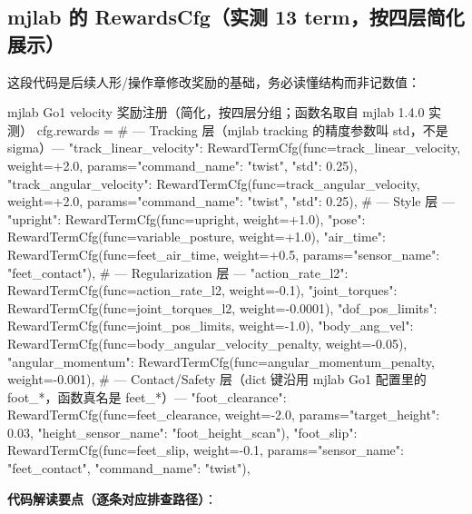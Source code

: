 \subsection{mjlab 的 RewardsCfg（实测 13 term，按四层简化展示）}
\label{sec:rlmc-ql-reward-cfg}

这段代码是后续人形/操作章修改奖励的基础，务必读懂结构而非记数值：

\begin{codebox}[Python]{mjlab Go1 velocity 奖励注册（简化，按四层分组；函数名取自 mjlab 1.4.0 实测）}
cfg.rewards = {
    # --- Tracking 层（mjlab tracking 的精度参数叫 std，不是 sigma）---
    "track_linear_velocity":  RewardTermCfg(func=track_linear_velocity,  weight=+2.0,
                                  params={"command_name": "twist", "std": 0.25}),
    "track_angular_velocity": RewardTermCfg(func=track_angular_velocity, weight=+2.0,
                                  params={"command_name": "twist", "std": 0.25}),
    # --- Style 层 ---
    "upright":          RewardTermCfg(func=upright,           weight=+1.0),
    "pose":             RewardTermCfg(func=variable_posture,  weight=+1.0),
    "air_time":         RewardTermCfg(func=feet_air_time,     weight=+0.5,
                            params={"sensor_name": "feet_contact"}),
    # --- Regularization 层 ---
    "action_rate_l2":   RewardTermCfg(func=action_rate_l2,            weight=-0.1),
    "joint_torques":    RewardTermCfg(func=joint_torques_l2,          weight=-0.0001),
    "dof_pos_limits":   RewardTermCfg(func=joint_pos_limits,          weight=-1.0),
    "body_ang_vel":     RewardTermCfg(func=body_angular_velocity_penalty, weight=-0.05),
    "angular_momentum": RewardTermCfg(func=angular_momentum_penalty,  weight=-0.001),
    # --- Contact/Safety 层（dict 键沿用 mjlab Go1 配置里的 foot_*，函数真名是 feet_*）---
    "foot_clearance": RewardTermCfg(func=feet_clearance, weight=-2.0,
                          params={"target_height": 0.03, "height_sensor_name": "foot_height_scan"}),
    "foot_slip":      RewardTermCfg(func=feet_slip, weight=-0.1,
                          params={"sensor_name": "feet_contact", "command_name": "twist"}),
}
\end{codebox}

\textbf{代码解读要点（逐条对应排查路径）}：

